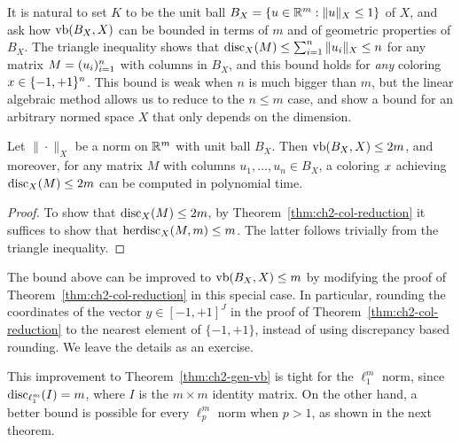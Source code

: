 It is natural to set \(K\) to be the unit ball \(B_X = \{u \in \mathbb{R}^m:
\|u\|_X \le 1\}\) of \(X\), and ask how \(\operatorname{vb}(B_X, X)\) can be bounded
in terms of \(m\) and of geometric properties of \(B_X\). The triangle
inequality shows that \(\operatorname{disc}_X(M) \le \sum_{i = 1}^n \|u_i\|_X \le
n\) for any matrix \(M = (u_i)_{i = 1}^n\) with columns in \(B_X\), 
and this bound holds for \emph{any} coloring \(x \in \{-1,
+1\}^n\). This bound is weak when \(n\) is much bigger than \(m\), but
the linear algebraic method
allows us to reduce to the
\(n \le m\) case, and show a bound for an arbitrary normed space \(X\)
that only depends on the dimension. 
\begin{theorem}\label{thm:ch2-gen-vb}
  Let \(\|\cdot\|_X\) be a norm on \(\mathbb{R}^m\) with unit ball
  \(B_X\).
  Then \(\operatorname{vb}(B_X, X) \le 2m\), and moreover, for any matrix
  $M$ with columns \(u_1, \ldots, u_n \in B_X\), a
  coloring \(x\) achieving \(\operatorname{disc}_X(M) \le 2m\) can
  be computed in polynomial time. 
\end{theorem}
\begin{proof}
  To show that \(\operatorname{disc}_X(M) \le
  2m\), by Theorem~\ref{thm:ch2-col-reduction} it suffices to
  show that \(\operatorname{herdisc}_X(M,m) \le  m\). The latter follows trivially from the triangle inequality.
\end{proof}

\remark The bound above can be improved to \(\operatorname{vb}(B_X, X) \le m\) by modifying the proof of Theorem~\ref{thm:ch2-col-reduction} in this special case. In particular, rounding the coordinates of the vector $y \in [-1,+1]^J$ in the proof of Theorem~\ref{thm:ch2-col-reduction} to the nearest element of $\{-1,+1\}$, instead of using discrepancy based rounding. We leave the details as an exercise. 

This improvement to Theorem~\ref{thm:ch2-gen-vb} is tight for the \(\ell_1^m\) norm, since
\(\operatorname{disc}_{\ell^m_1}(I) = m\), where \(I\) is the \(m\times m\) identity
matrix. On the other hand, a better bound is possible for every
\(\ell^m_p\) norm when \(p > 1\), as shown in the next theorem. 

